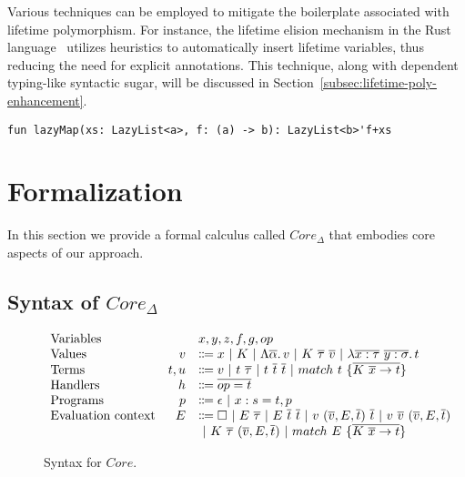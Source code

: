 \documentclass[11pt]{article}
\newcommand{\vor}{~|~}
\newcommand{\ap}{~}
\begin{document}
    Various techniques can be employed to mitigate the boilerplate associated with lifetime polymorphism.
    For instance, the lifetime elision mechanism in the Rust language~\cite{matsakis2014rust} utilizes heuristics to automatically insert lifetime variables, thus reducing the need for explicit annotations.
    This technique, along with dependent typing-like syntactic sugar, will be discussed in Section~\ref{subsec:lifetime-poly-enhancement}.
    \begin{lstlisting}[language=colang]
    fun lazyMap(xs: LazyList<a>, f: (a) -> b): LazyList<b>'f+xs
    \end{lstlisting}



    \section{Formalization}

    In this section we provide a formal calculus called $Core_{\Delta}$ that embodies core aspects of our approach.

    \subsection{Syntax of $Core_\Delta$}

    \begin{figure}
        \centering
        \begin{gather*}
            \begin{array}{lrll}
                \text{Variables} & & x, y, z, f, g, op \\
                \text{Values} &v &\Coloneqq x \vor K \vor \Lambda \overline{\alpha} \ldotp v \vor K\ap \overline{\tau} \ap \overline{v} \vor \lambda \overline{x : \tau}~\overline{y : \sigma}\ldotp t
                \\
                \text{Terms} &t, u &\Coloneqq v \vor t\ap\overline{\tau} \vor t \ap \overline{t} \ap \overline{t} \vor match ~ t ~\{\overline{K \ap \overline{x} \to t}\}
                \\
                \text{Handlers} &h &\Coloneqq \overline{op = t}
                \\
                \text{Programs} &p &\Coloneqq \epsilon \vor x : s = t, p
                \\
                \text{Evaluation context} & E & \Coloneqq \square \vor E \ap \overline{\tau} \vor E \ap \overline{t}\ap \overline{t} \vor v \ap (\overline{v}, E, \overline{t}) \ap \overline{t} \vor v \ap \overline{v} \ap (\overline{v}, E, \overline{t}) \\
                && \vor K\ap\overline{\tau}\ap(\overline{v}, E, \overline{t}) \vor match\ap E\ap \{\overline{K\ap\overline{x}\to t}\}
            \end{array}
        \end{gather*}
        \caption{Syntax for $Core$.}
        \label{fig:core-syntax}
    \end{figure}
\end{document}
